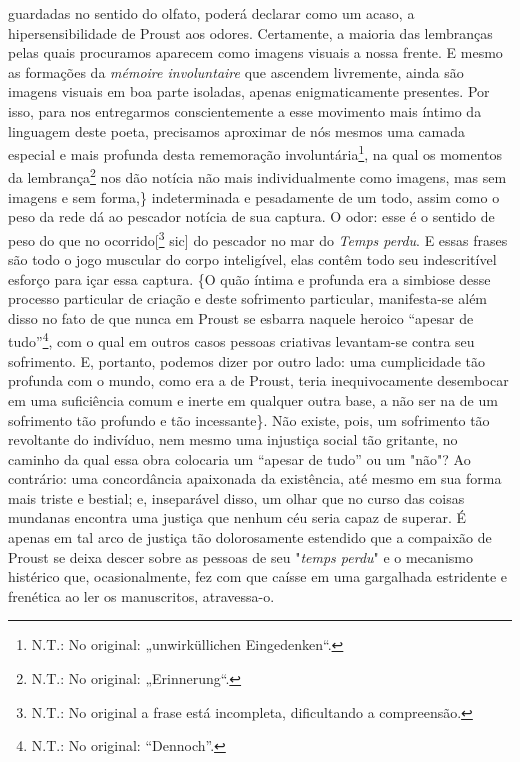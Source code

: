 guardadas no sentido do olfato, poderá declarar como um acaso, a
hipersensibilidade de Proust aos odores. Certamente, a maioria das
lembranças pelas quais procuramos aparecem como imagens visuais a nossa
frente. E mesmo as formações da \emph{mémoire involuntaire} que ascendem
livremente, ainda são imagens visuais em boa parte isoladas, apenas
enigmaticamente presentes. Por isso, para nos entregarmos
conscientemente a esse movimento mais íntimo da linguagem deste poeta,
precisamos aproximar de nós mesmos uma camada especial e mais profunda
desta rememoração involuntária\footnote{N.T.: No original:
  „unwirküllichen Eingedenken``.}, na qual os momentos da
lembrança\footnote{N.T.: No original: „Erinnerung``.} nos dão notícia
não mais individualmente como imagens, mas sem imagens e sem forma,\}
indeterminada e pesadamente de um todo, assim como o peso da rede dá ao
pescador notícia de sua captura. O odor: esse é o sentido de peso do que
no ocorrido{[}\footnote{N.T.: No original a frase está incompleta,
  dificultando a compreensão.} sic{]} do pescador no mar do \emph{Temps
perdu}. E essas frases são todo o jogo muscular do corpo inteligível,
elas contêm todo seu indescritível esforço para içar essa captura. \{O
quão íntima e profunda era a simbiose desse processo particular de
criação e deste sofrimento particular, manifesta-se além disso no fato
de que nunca em Proust se esbarra naquele heroico ``apesar de
tudo''\footnote{N.T.: No original: ``Dennoch''.}, com o qual em outros
casos pessoas criativas levantam-se contra seu sofrimento. E, portanto,
podemos dizer por outro lado: uma cumplicidade tão profunda com o mundo,
como era a de Proust, teria inequivocamente desembocar em uma
suficiência comum e inerte em qualquer outra base, a não ser na de um
sofrimento tão profundo e tão incessante\}. Não existe, pois, um
sofrimento tão revoltante do indivíduo, nem mesmo uma injustiça social
tão gritante, no caminho da qual essa obra colocaria um ``apesar de
tudo'' ou um "não"? Ao contrário: uma concordância apaixonada da
existência, até mesmo em sua forma mais triste e bestial; e, inseparável
disso, um olhar que no curso das coisas mundanas encontra uma justiça
que nenhum céu seria capaz de superar. É apenas em tal arco de justiça
tão dolorosamente estendido que a compaixão de Proust se deixa descer
sobre as pessoas de seu "\emph{temps perdu}" e o mecanismo histérico
que, ocasionalmente, fez com que caísse em uma gargalhada estridente e
frenética ao ler os manuscritos, atravessa-o.

